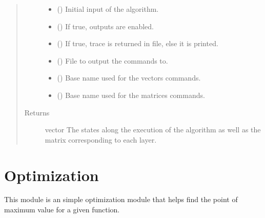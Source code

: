 \documentclass[letterpaper,10pt,english]{sphinxmanual}
\begin{document}
\begin{fulllineitems}
\begin{quote}
\begin{description}
\begin{itemize}
\item {} 
 () \textendash{} Initial input of the algorithm.

\item {} 
 () \textendash{} If true, outputs are enabled.

\item {} 
 () \textendash{} If true, trace is returned in file, else it is 
printed.

\item {} 
 () \textendash{} File to output the commands to.

\item {} 
 () \textendash{} Base name used for the vectors commands.

\item {} 
 () \textendash{} Base name used for the matrices commands.

\end{itemize}

\item[{Returns}] \leavevmode
vector \textendash{} The states along the execution of the algorithm as well as
the matrix corresponding to each layer.

\end{description}\end{quote}

\end{fulllineitems}



\section{Optimization}
\label{\detokenize{opti:module-opti}}\label{\detokenize{opti:optimization}}\label{\detokenize{opti::doc}}
This module is an simple optimization module that helps find the point of 
maximum value for a given function.
\end{document}
